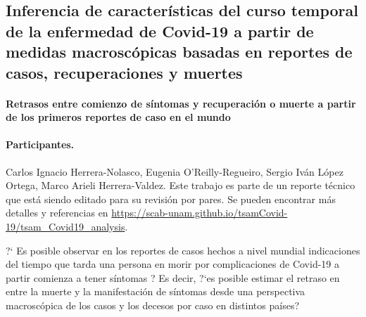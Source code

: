 \subsection*{Inferencia de características del curso temporal de la enfermedad de Covid-19 a partir de medidas macroscópicas basadas en reportes de casos, recuperaciones y muertes}

\paragraph{Retrasos entre comienzo de síntomas y recuperación o muerte a partir de los primeros reportes de caso en el mundo}


\paragraph{Participantes.} Carlos Ignacio Herrera-Nolasco, Eugenia O'Reilly-Regueiro, Sergio Iván López Ortega, Marco Arieli Herrera-Valdez. Este trabajo es parte de un reporte técnico que está siendo editado para su revisión por pares. Se pueden encontrar más detalles y referencias en \url{https://scab-unam.github.io/tsamCovid-19/tsam_Covid19_analysis}.  

?` Es posible observar en los reportes de casos hechos a nivel mundial indicaciones del tiempo que tarda una persona en morir por complicaciones de Covid-19 a partir comienza a tener síntomas ? Es decir, ?`es posible estimar el retraso en entre la muerte y la manifestación de síntomas desde una perspectiva macroscópica de los casos y los decesos por caso en distintos países?

